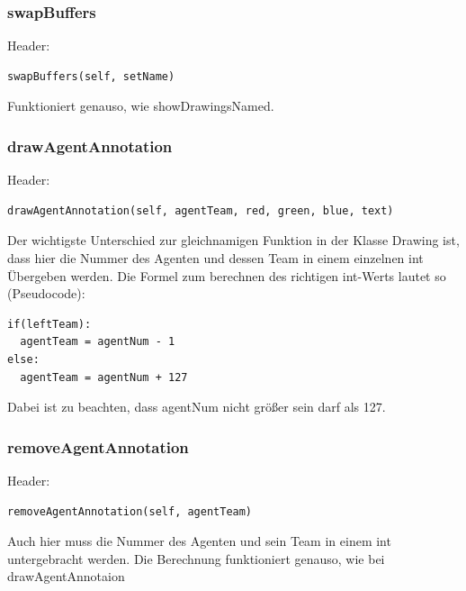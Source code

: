 \subsubsection*{swapBuffers}
Header:

\begin{verbatim}swapBuffers(self, setName)
\end{verbatim}
Funktioniert genauso, wie showDrawingsNamed.

\subsubsection*{drawAgentAnnotation}
Header:

\begin{verbatim}drawAgentAnnotation(self, agentTeam, red, green, blue, text)
\end{verbatim}
Der wichtigste Unterschied zur gleichnamigen Funktion in der Klasse 
Drawing ist, dass hier die Nummer des Agenten und dessen Team in einem 
einzelnen int Übergeben werden. Die Formel zum berechnen des richtigen 
int-Werts lautet so (Pseudocode):

\begin{verbatim}if(leftTeam):
  agentTeam = agentNum - 1
else:
  agentTeam = agentNum + 127
\end{verbatim}
Dabei ist zu beachten, dass agentNum nicht größer sein darf als 127.       

\subsubsection*{removeAgentAnnotation}
Header:

\begin{verbatim}removeAgentAnnotation(self, agentTeam)
\end{verbatim}
Auch hier muss die Nummer des Agenten und sein Team in einem int 
untergebracht werden. Die Berechnung funktioniert genauso, wie bei drawAgentAnnotaion

